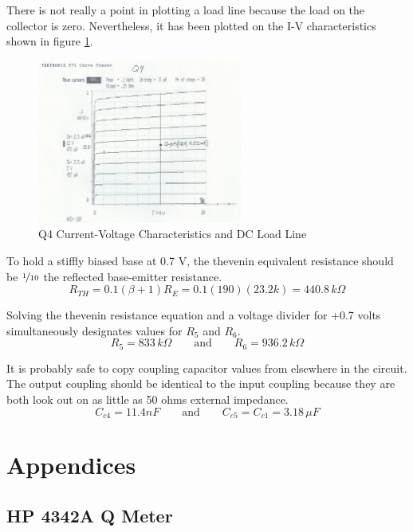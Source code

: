 \documentclass[titlepage, letterpaper, 11pt]{article}
\begin{document}
There is not really a point in plotting a load line because the load
on the collector is zero. Nevertheless, it has been plotted on the
I-V characteristics shown in figure \ref{q4Characteristics}.

\begin{figure}[ht]
	\centering
	\includegraphics[width=0.6\textwidth]
		{measurements/q4Characteristics}
	\caption{
		Q4 Current-Voltage Characteristics and DC Load Line
	}
	\label{q4Characteristics}
\end{figure}

To hold a stiffly biased base at 0.7 V, the thevenin equivalent
resistance should be $\nicefrac{1}{10}$ the reflected base-emitter
resistance.
\begin{equation*}
R_{TH}=0.1(\beta+1)R_{E}=0.1(190)(23.2k)=440.8\,k\Omega
\end{equation*}

Solving the thevenin resistance equation and a voltage divider for
+0.7 volts simultaneously designates values for $R_{5}$ and $R_{6}$.
\begin{equation*}
R_{5}=833\,k\Omega\qquad\textrm{and}\qquad R_{6}=936.2\,k\Omega
\end{equation*}

It is probably safe to copy coupling capacitor values from elsewhere
in the circuit. The output coupling should be identical to the input
coupling because they are both look out on as little as 50 ohms external
impedance.
\begin{equation*}
C_{c4}=11.4nF\qquad\textrm{and}\qquad C_{c5}=C_{c1}=3.18\,\mu F
\end{equation*}

\section{Appendices}

\subsection{HP 4342A Q Meter}
\label{qMeter}
\end{document}
